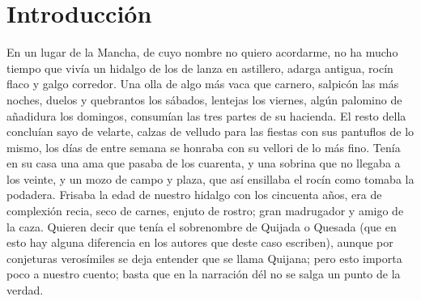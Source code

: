 \documentclass[12pt,
               spanish
              ]{article}
\begin{document}
\section*{Introducción}
\label{sec:cero}

\begin{flushleft}
En un lugar de la Mancha, de cuyo nombre no quiero acordarme, no ha
mucho tiempo que vivía un hidalgo de los de lanza en astillero, adarga
antigua, rocín flaco y galgo corredor. Una olla de algo más vaca que
carnero, salpicón las más noches, duelos y quebrantos los sábados,
lentejas los viernes, algún palomino de añadidura los domingos,
consumían las tres partes de su hacienda. El resto della concluían
sayo de velarte, calzas de velludo para las fiestas con sus pantuflos
de lo mismo, los días de entre semana se honraba con su vellori de lo
más fino. Tenía en su casa una ama que pasaba de los cuarenta, y una
sobrina que no llegaba a los veinte, y un mozo de campo y plaza, que
así ensillaba el rocín como tomaba la podadera. Frisaba la edad de
nuestro hidalgo con los cincuenta años, era de complexión recia, seco
de carnes, enjuto de rostro; gran madrugador y amigo de la
caza. Quieren decir que tenía el sobrenombre de Quijada o Quesada (que
en esto hay alguna diferencia en los autores que deste caso escriben),
aunque por conjeturas verosímiles se deja entender que se llama
Quijana; pero esto importa poco a nuestro cuento; basta que en la
narración dél no se salga un punto de la verdad.  
\end{flushleft}
\end{document}
